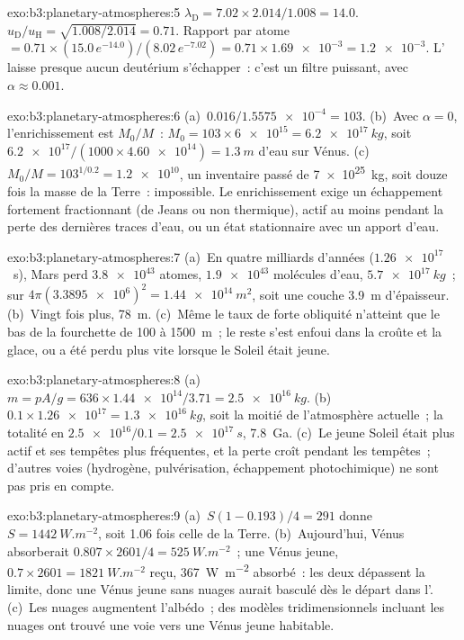 \begin{solution}{exo:b3:planetary-atmospheres:5}
$\lambda_\mathrm D = 7.02\times2.014/1.008 = 14.0$. $u_\mathrm D/u_\mathrm H
= \sqrt{1.008/2.014} = 0.71$. Rapport par atome $= 0.71\times(15.0\,
e^{-14.0})/(8.02\,e^{-7.02}) = 0.71\times\num{1.69e-3} = \num{1.2e-3}$.
L' laisse presque aucun deutérium s'échapper~: c'est un filtre puissant, avec
$\alpha \approx 0.001$.
\end{solution}

\begin{solution}{exo:b3:planetary-atmospheres:6}
(a)~$0.016/\num{1.5575e-4} = 103$. (b)~Avec $\alpha = 0$, l'enrichissement est
$M_0/M$~: $M_0 = 103\times\num{6e15} = \qty{6.2e17}{kg}$, soit
$\num{6.2e17}/(1000\times\num{4.60e14}) = \qty{1.3}{m}$ d'eau sur
Vénus. (c)~$M_0/M = 103^{1/0.2} = \num{1.2e10}$, un inventaire passé de
\qty{7e25}{kg}, soit douze fois la masse de la Terre~: impossible. Le
enrichissement exige un échappement fortement fractionnant (de Jeans ou non thermique),
actif au moins pendant la perte des dernières traces d'eau, ou un
état stationnaire avec un apport d'eau.
\end{solution}

\begin{solution}{exo:b3:planetary-atmospheres:7}
(a)~En quatre milliards d'années ($\num{1.26e17}$~s), Mars perd
$\num{3.8e43}$ atomes, $\num{1.9e43}$ molécules d'eau, $\qty{5.7e17}{kg}$~;
sur $4\pi(\num{3.3895e6})^2 = \qty{1.44e14}{m^2}$, soit une couche
\qty{3.9}{m} d'épaisseur. (b)~Vingt fois plus, \qty{78}{m}. (c)~Même le
taux de forte obliquité n'atteint que le bas de la fourchette de 100 à
\qty{1500}{m}~; le reste s'est enfoui dans la croûte et la glace, ou a été perdu
plus vite lorsque le Soleil était jeune.
\end{solution}

\begin{solution}{exo:b3:planetary-atmospheres:8}
(a)~$m = pA/g = 636\times\num{1.44e14}/3.71 = \qty{2.5e16}{kg}$.
(b)~$0.1\times\num{1.26e17} = \qty{1.3e16}{kg}$, soit la moitié
de l'atmosphère actuelle~; la totalité en $\num{2.5e16}/0.1 = \qty{2.5e17}{s}$,
\qty{7.8}{Ga}. (c)~Le jeune Soleil était plus actif et ses
tempêtes plus fréquentes, et la perte croît pendant les tempêtes~; d'autres voies
(hydrogène, pulvérisation, échappement photochimique) ne sont pas pris en compte.
\end{solution}

\begin{solution}{exo:b3:planetary-atmospheres:9}
(a)~$S(1 - 0.193)/4 = 291$ donne $S = \qty{1442}{W.m^{-2}}$, soit 1.06 fois
celle de la Terre. (b)~Aujourd'hui, Vénus absorberait $0.807\times2601/4 =
\qty{525}{W.m^{-2}}$~; une Vénus jeune, $0.7\times2601 = \qty{1821}{W.m^{-2}}$
reçu, \qty{367}{W.m^{-2}} absorbé~: les deux dépassent la limite, donc une
Vénus jeune sans nuages aurait basculé dès le départ dans l'. (c)~Les nuages
augmentent l'albédo~; des modèles tridimensionnels incluant les nuages ont trouvé une voie
vers une Vénus jeune habitable.
\end{solution}

